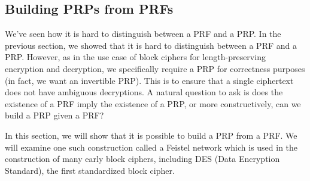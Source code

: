\subsection{Building PRPs from PRFs}
We've seen how it is hard to distinguish between a PRF and a PRP. 
In the previous section, we showed that it is hard to distinguish between a PRF and a PRP. 
However, as in the use case of block ciphers for length-preserving encryption and decryption, we specifically require a PRP for correctness purposes (in fact, we want an invertible PRP).
This is to ensure that a single ciphertext does not have ambiguous decryptions.
A natural question to ask is does the existence of a PRF imply the existence of a PRP, or more constructively, can we build a PRP given a PRF?

In this section, we will show that it is possible to build a PRP from a PRF.
We will examine one such construction called a Feistel network which is used in the construction of many early block ciphers, including DES (Data Encryption Standard), the first standardized block cipher.


